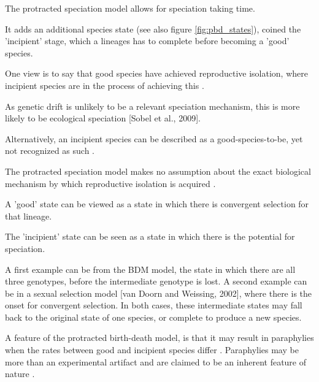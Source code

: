 \documentclass{article}
\begin{document}


The protracted speciation model \cite{etienne2012prolonging} allows for speciation taking time.

It adds an additional species state (see also figure \ref{fig:pbd_states}),
coined the 'incipient' stage, which a lineages has to complete before becoming
a 'good' species.

One view is to say that good species have achieved reproductive isolation,
where incipient species are in the process of achieving this .

As genetic drift is unlikely to be a relevant speciation mechanism,
this is more likely to be ecological speciation [Sobel et al., 2009]. 

Alternatively, an incipient species can be described as a good-species-to-be,
yet not recognized as such .


The protracted speciation model makes no assumption about the exact biological
mechanism by which reproductive isolation is 
acquired \cite{etienne2012prolonging, etienne2014estimating,rosindell2010protracted}.

A 'good' state can be viewed as a state in which there is convergent selection
for that lineage.

The 'incipient' state can be seen as a state in which there is the potential
for speciation.

A first example can be from the BDM  model, the state in which there
are all three genotypes, before the intermediate genotype is lost.
A second example can be in a sexual selection model [van Doorn and Weissing, 2002], 
where there is the onset for convergent selection.
In both cases, these intermediate states may fall back to the original
state of one species, or complete to produce a new species.


A feature of the protracted birth-death model, is that it may result in
paraphylies when the rates between good and incipient species differ .
Paraphylies may be more than an experimental artifact and are claimed to
be an inherent feature of nature \cite{funk2003species}.
\end{document}
